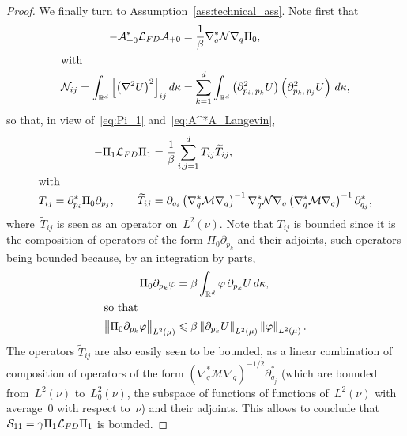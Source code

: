 \documentclass[10pt,a4paper]{article}
\numberwithin{equation}{section}
\newcommand{\cLs}{\mathcal{S}}
\newcommand{\cLa}{\mathcal{A}}
\newcommand{\cLM}{\mathcal{M}}
\newcommand{\cLN}{\mathcal{N}}
\newcommand{\R}{\mathbb{R}}
\newcommand{\cLFD}{\mathcal{L}_{\rm FD}}
\newcommand{\subplus}{\textnormal{\texttt{+}}}
\renewcommand{\leq}{\leqslant}
\begin{document}
\begin{proof}
We finally turn to Assumption~\ref{ass:technical_ass}. Note first that
\begin{align*}
-\cLa_{\subplus 0}^* \cLFD \cLa_{\subplus 0} &= \frac{1}{\beta} \nabla_q^* \cLN \nabla_q \Pi_0,
\\
\intertext{with}
\cLN_{ij} = \int_{\R^d} \left[\left(\nabla^2 U\right)^2\right]_{ij} d\kappa &= \sum_{k=1}^d \int_{\R^d} \left(\partial^2_{p_i,\,p_k} U\right)\left(\partial^2_{p_k,\,p_j} U\right) \, d\kappa,
\end{align*}
so that, in view of~\eqref{eq:Pi_1} and~\eqref{eq:A^*A_Langevin},
\begin{align*}
-\Pi_1 \cLFD \Pi_1 &= \frac{1}{\beta}\sum_{i,j=1}^d T_{ij}\widetilde{T}_{ij},
\\
\intertext{with}
T_{ij} = \partial_{p_i}^* \Pi_0 \partial_{p_j},
\qquad
\widetilde{T}_{ij} &= \partial_{q_i} \left(\nabla_q^* \cLM \nabla_q\right)^{-1}\nabla_q^* \cLN \nabla_q \left(\nabla_q^* \cLM \nabla_q\right)^{-1} \partial_{q_j}^*,
\end{align*}
where~$\widetilde{T}_{ij}$ is seen as an operator on~$L^2(\nu)$. Note that $T_{ij}$ is bounded since it is the composition of operators of the form $\Pi_0 \partial_{p_k}$ and their adjoints, such operators being bounded because, by an integration by parts,
\begin{align*}
\Pi_0 \partial_{p_k} \varphi &= \beta \int_{\R^d} \varphi \, \partial_{p_k}U \, d\kappa,
\\
\intertext{so that}
\big\| \Pi_0 \partial_{p_k} \varphi \big\|_{L^2(\mu)} &\leq \beta\left\|\partial_{p_k} U\right\|_{L^2(\mu)}\left\|\varphi\right\|_{L^2(\mu)}.
\end{align*}
The operators $\widetilde{T}_{ij}$ are also easily seen to be bounded, as a linear combination of composition of operators of the form $(\nabla_q^* \cLM \nabla_q)^{-1/2} \partial_{q_j}^*$ (which are bounded from~$L^2(\nu)$ to~$L^2_0(\nu)$, the subspace of functions of functions of~$L^2(\nu)$ with average~0 with respect to~$\nu$) and their adjoints. This allows to conclude that $\cLs_{11} = \gamma \Pi_1\cLFD \Pi_1$ is bounded.


\end{proof}
\end{document}
